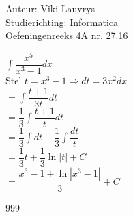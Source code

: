 \documentclass[a4paper]{article}
\begin{document}
  
\noindent \large Auteur: Viki	Lauvrys \\
\noindent \large Studierichting: Informatica\\
\noindent \large Oefeningenreeks 4A nr. 27.16\\

\medskip

\normalsize

$ \displaystyle\int \dfrac{x^5}{x^3-1} dx $ \\

Stel $ t = x^3 - 1 \Rightarrow dt = 3x^2 dx$ \\

$ = \displaystyle\int \dfrac{t+1}{3t} dt $ \\

$ = \dfrac{1}{3} \displaystyle\int \dfrac{t+1}{t} dt $ \\

$ = \dfrac{1}{3} \displaystyle\int dt + \dfrac{1}{3} \displaystyle\int \dfrac{dt}{t} $ \\

$ = \dfrac{1}{3}t + \dfrac{1}{3} \ln |t| + C $ \\

$ = \dfrac{x^3 - 1 + \ln |x^3-1|}{3} + C $ \\


\begin{thebibliography}{999}
\end{thebibliography}
\end{document}
